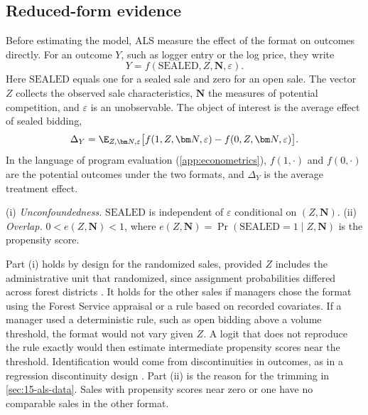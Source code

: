 \subsection{Reduced-form evidence}\label{sec:15-als-reduced}

Before estimating the model, ALS measure the effect of the format on outcomes directly. For an outcome
$Y$, such as logger entry or the log price, they write \citep[eq.~(5)]{AtheyLevinSeira2011}
\begin{equation}\label{eq:15-als-po}
Y=f(\mathrm{SEALED},Z,\bm N,\varepsilon).
\end{equation}
Here $\mathrm{SEALED}$ equals one for a sealed sale and zero for an open sale. The vector $Z$ collects
the observed sale characteristics, $\bm N$ the measures of potential competition, and $\varepsilon$ is an
unobservable. The object of
interest is the average effect of sealed bidding,
\begin{equation}\label{eq:15-als-ate}
\Delta_Y=\E_{Z,\bm N,\varepsilon}\bigl[f(1,Z,\bm N,\varepsilon)-f(0,Z,\bm N,\varepsilon)\bigr].
\end{equation}
In the language of program evaluation (\cref{app:econometrics}), $f(1,\cdot)$ and $f(0,\cdot)$ are the
potential outcomes under the two formats, and $\Delta_Y$ is the average treatment effect.

\begin{assumption}\label{ass:15-als-unconf}
(i) \emph{Unconfoundedness.} $\mathrm{SEALED}$ is independent of $\varepsilon$ conditional on
$(Z,\bm N)$. (ii) \emph{Overlap.} $0<e(Z,\bm N)<1$, where $e(Z,\bm N)=\Pr(\mathrm{SEALED}=1\mid Z,\bm N)$
is the propensity score.
\end{assumption}

Part (i) holds by design for the randomized sales, provided $Z$ includes the administrative unit that
randomized, since assignment probabilities differed across forest districts
\citep[p.~229]{AtheyLevinSeira2011}. It holds for the other sales if managers chose the format using the
Forest Service appraisal or a rule based on recorded covariates. If a manager used a deterministic rule,
such as open bidding above a volume threshold, the format would not vary given $Z$. A logit that does
not reproduce the rule exactly would then estimate intermediate propensity scores near the threshold.
Identification would come from discontinuities in outcomes, as in a regression discontinuity design
\citep[footnote 13]{AtheyLevinSeira2011}. Part (ii) is the reason for the trimming in
\cref{sec:15-als-data}. Sales with propensity scores near zero or one have no comparable sales in the
other format.

